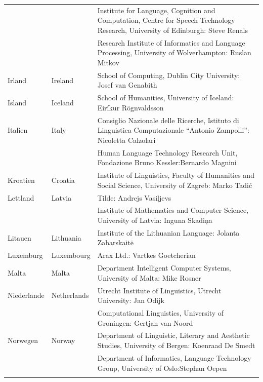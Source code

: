 \begin{longtable}{@{}llp{113mm}@{}}
  & & Institute for Language, Cognition and Computation, Centre for Speech Technology Research, University of Edinburgh: Steve Renals \\ \addlinespace 
  & & Research Institute of Informatics and Language Processing, University of Wolverhampton: Ruslan Mitkov \\ \addlinespace 
  Irland & \textcolor{grey1}{Ireland} & School of Computing, Dublin City University: Josef van Genabith\\ \addlinespace
  Island & \textcolor{grey1}{Iceland} & School of Humanities, University of Iceland: Eiríkur Rögnvaldsson\\ \addlinespace
  Italien & \textcolor{grey1}{Italy} & Consiglio Nazionale delle Ricerche, Istituto di Linguistica Computazionale “Antonio Zampolli”: Nicoletta Calzolari\\ \addlinespace
  & & Human Language Technology Research Unit, Fondazione Bruno Kessler:\newline Bernardo Magnini\\ \addlinespace 
  Kroatien & \textcolor{grey1}{Croatia} & Institute of Linguistics, Faculty of Humanities and Social Science, University of Zagreb: Marko Tadić \\ \addlinespace
  Lettland & \textcolor{grey1}{Latvia} & Tilde: Andrejs Vasiļjevs\\ \addlinespace 
  & & Institute of Mathematics and Computer Science, University of Latvia: Inguna Skadiņa\\ \addlinespace
  Litauen & \textcolor{grey1}{Lithuania} & Institute of the Lithuanian Language: Jolanta Zabarskaitė\\ \addlinespace
  Luxemburg & \textcolor{grey1}{Luxembourg} & Arax Ltd.: Vartkes Goetcherian\\ \addlinespace
  Malta & \textcolor{grey1}{Malta} & Department Intelligent Computer Systems, University of Malta: Mike Rosner\\ \addlinespace
  Niederlande & \textcolor{grey1}{Netherlands} & Utrecht Institute of Linguistics, Utrecht University: Jan Odijk\\ \addlinespace 
  & & Computational Linguistics, University of Groningen: Gertjan van Noord\\ \addlinespace
  Norwegen & \textcolor{grey1}{Norway} & Department of Linguistic, Literary and Aesthetic Studies, University of Bergen: Koenraad De Smedt\\ \addlinespace 
  & & Department of Informatics, Language Technology Group, University of Oslo:\newline Stephan Oepen \\ \addlinespace

\end{longtable}
